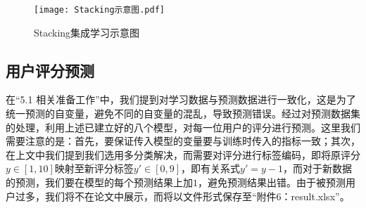 \documentclass{MathorCupmodeling}
\begin{document}
	\begin{figure}[H]
		\centerline{\texttt{[image: Stacking示意图.pdf]}}
		\caption{Stacking集成学习示意图}\label{fig:StackingPicture}
	\end{figure}
	\subsection{用户评分预测}
	在“5.1 相关准备工作”中，我们提到对学习数据与预测数据进行一致化，这是为了统一预测的自变量，避免不同的自变量的混乱，导致预测错误。经过对预测数据集的处理，利用上述已建立好的八个模型，对每一位用户的评分进行预测。这里我们需要注意的是：首先，要保证传入模型的变量要与训练时传入的指标一致；其次，在上文中我们提到我们选用多分类解决，而需要对评分进行标签编码，即将原评分$y\in\left[1,10\right]$映射至新评分标签$y'\in\left[0,9\right]$，即有关系式$y'=y-1$，而对于新数据的预测，我们要在模型的每个预测结果上加$1$，避免预测结果出错。由于被预测用户过多，我们将不在论文中展示，而将以文件形式保存至“附件6：result.xlsx”。
	
\end{document}
